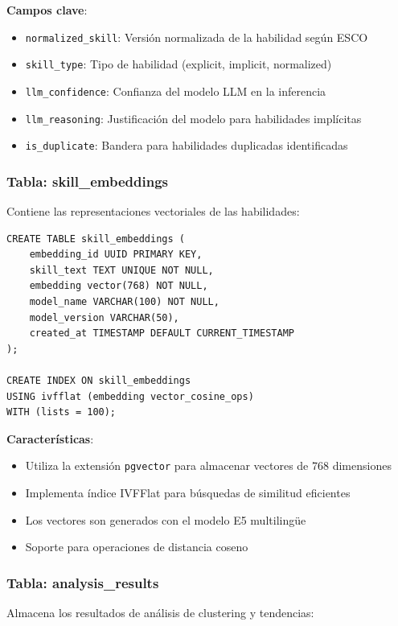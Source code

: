 \textbf{Campos clave}:
\begin{itemize}
    \item \texttt{normalized\_skill}: Versión normalizada de la habilidad según ESCO
    \item \texttt{skill\_type}: Tipo de habilidad (explicit, implicit, normalized)
    \item \texttt{llm\_confidence}: Confianza del modelo LLM en la inferencia
    \item \texttt{llm\_reasoning}: Justificación del modelo para habilidades implícitas
    \item \texttt{is\_duplicate}: Bandera para habilidades duplicadas identificadas
\end{itemize}

\subsubsection{Tabla: skill\_embeddings}

Contiene las representaciones vectoriales de las habilidades:

\begin{verbatim}
CREATE TABLE skill_embeddings (
    embedding_id UUID PRIMARY KEY,
    skill_text TEXT UNIQUE NOT NULL,
    embedding vector(768) NOT NULL,
    model_name VARCHAR(100) NOT NULL,
    model_version VARCHAR(50),
    created_at TIMESTAMP DEFAULT CURRENT_TIMESTAMP
);

CREATE INDEX ON skill_embeddings
USING ivfflat (embedding vector_cosine_ops)
WITH (lists = 100);
\end{verbatim}

\textbf{Características}:
\begin{itemize}
    \item Utiliza la extensión \texttt{pgvector} para almacenar vectores de 768 dimensiones
    \item Implementa índice IVFFlat para búsquedas de similitud eficientes
    \item Los vectores son generados con el modelo E5 multilingüe
    \item Soporte para operaciones de distancia coseno
\end{itemize}

\subsubsection{Tabla: analysis\_results}

Almacena los resultados de análisis de clustering y tendencias:

